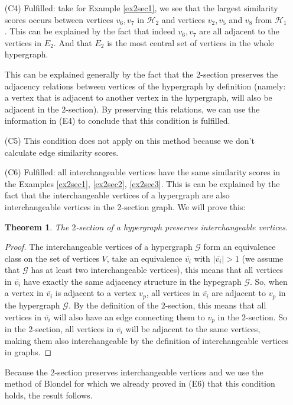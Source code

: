 \documentclass[a4paper,11pt]{report}
\newtheorem{theorem}{Theorem}[section]
\newcommand{\hgraf}{\mathcal{G}}
\newcommand{\hgrafeen}{\mathcal{H}}
\begin{document}
\begin{itemize}
  \item[(C4)] Fulfilled: take for Example \ref{ex2sec1}, we see that the largest similarity scores
  occurs between vertices $v_6, v_7$ 
  in $\hgrafeen_2$ and vertices $v_2, v_5$ and $v_8$ from $\hgrafeen_1$. This can 
  be explained by the fact that indeed $v_6,v_7$ are all adjacent to the vertices in $E_2$. And that $E_2$ is the 
  most central set of vertices in the whole hypergraph. 
  
  This can be explained 
  generally by the fact that the 2-section preserves the adjacency relations between 
  vertices of the hypergraph by definition (namely: a vertex that is adjacent to another vertex in the hypergraph, will also be adjacent in the $2$-section). By preserving this relations, we can 
  use the information in (E4) to conclude that this condition is fulfilled.
    \item[(C5)] This condition does not apply on this method because we don't calculate edge similarity scores.
   \item[(C6)] Fulfilled: all interchangeable vertices have the same similarity 
   scores in the Examples \ref{ex2sec1}, \ref{ex2sec2}, \ref{ex2sec3}. This is can be explained
   by the fact that the interchangeable vertices of a hypergraph are also 
   interchangeable vertices in the 2-section graph. We will prove this:
   
    \begin{theorem}
   The $2$-section of a hypergraph preserves interchangeable vertices. \end{theorem}
 \begin{proof}
   The interchangeable vertices of a hypergraph $\hgraf$ form an equivalence class on the set of vertices
   $V$, take an equivalence $\overline{v_i}$ with $|\overline{v_i}| > 1$ (we assume that $\hgraf$ has at least two interchangeable vertices),
   this means that all vertices in $\overline{v_i}$ have exactly the same adjacency structure in the hypegraph $\hgraf$.  
   So, when a vertex in $\overline{v_i}$ is adjacent to a vertex $v_p$, all 
   vertices in $\overline{v_i}$ are adjacent to $v_p$ in the hypergraph 
   $\hgraf$. By the definition of the $2$-section, this means that all vertices 
   in $\overline{v_i}$ will also have an edge connecting them to $v_p$ in the 
   $2$-section. So in the $2$-section, all vertices in $\overline{v_i}$ will be adjacent to 
  the same vertices, making them also interchangeable by the definition of interchangeable vertices in graphs.   
   
 \end{proof}
 Because the $2$-section preserves interchangeable vertices and we use the method of Blondel for which we already proved
 in (E6) that this condition holds, the result follows.
   

\end{itemize}
\end{document}
